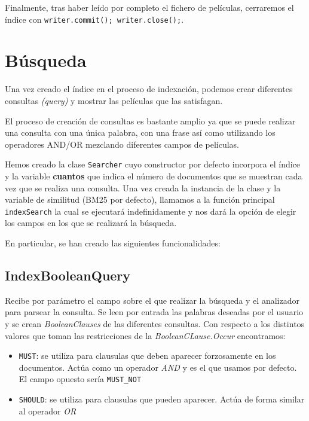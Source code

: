 Finalmente, tras haber leído por completo el fichero de películas, cerraremos el índice con \texttt{writer.commit(); writer.close();}.\\

\section{Búsqueda}
Una vez creado el índice en el proceso de indexación, podemos crear diferentes consultas \textit{(query)} y mostrar las películas que las satisfagan. 

El proceso de creación de consultas es bastante amplio ya que se puede realizar una consulta con una única palabra, con una frase así como utilizando los operadores AND/OR mezclando diferentes campos de películas. 

Hemos creado la clase \texttt{Searcher} cuyo constructor por defecto incorpora el índice y la variable \textbf{cuantos} que indica el número de documentos que se muestran cada vez que se realiza una consulta.
Una vez creada la instancia de la clase y la variable de similitud (BM25 por defecto), llamamos a la función principal \texttt{indexSearch} la cual se ejecutará indefinidamente y nos dará la opción de elegir los campos en los que se realizará la búsqueda.

En particular, se han creado las siguientes funcionalidades:

\subsection{IndexBooleanQuery}
Recibe por parámetro el campo sobre el que realizar la búsqueda y el analizador para parsear la consulta.
Se leen por entrada las palabras deseadas por el usuario y se crean \textit{BooleanClauses} de las diferentes consultas.
Con respecto a los distintos valores que toman las restricciones de la \textit{BooleanCLause.Occur} encontramos:

\begin{itemize}
	\item \texttt{MUST}: se utiliza para clausulas que deben aparecer forzosamente en los documentos. Actúa como un operador \textit{AND} y es el que usamos por defecto. El campo opuesto sería \texttt{MUST\_NOT}
	
	\item \texttt{SHOULD}: se utiliza para clausulas que pueden aparecer. Actúa de forma similar al operador \textit{OR}
\end{itemize}

